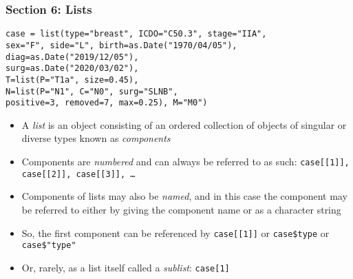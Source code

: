 \documentclass[11pt,pdftex,dvipsnames,usenames,helvetica]{beamer}
\begin{document}
\begin{frame}
\frametitle{Section 6: Lists}

{\tt case = list(type="breast", ICDO="C50.3", stage="IIA",\\
\qquad sex="F", side="L", birth=as.Date("1970/04/05"),\\
\qquad diag=as.Date("2019/12/05"), \\
\qquad surg=as.Date("2020/03/02"), \\
\qquad T=list(P="T1a", size=0.45),\\
\qquad N=list(P="N1", C="N0", surg="SLNB",\\
\qquad positive=3, removed=7, max=0.25), M="M0")}
\begin{itemize}
\item A {\it list} is an object consisting of an ordered collection of
  objects of singular or diverse types known as {\it components}
\item Components are {\it numbered} and can always be referred to as such:
{\tt case[[1]], case[[2]], case[[3]], \dots}
\item Components of lists may also be {\it named}, and in this case
  the component may be referred to either by giving the component name
  or as a character string
\item So, the first component can be referenced by
{\tt case[[1]]} or {\tt case\$type} or {\tt case\$"type"}
\item Or, rarely, as a list itself called a {\it sublist}: {\tt case[1]}
\end{itemize}

\end{frame}
\end{document}
